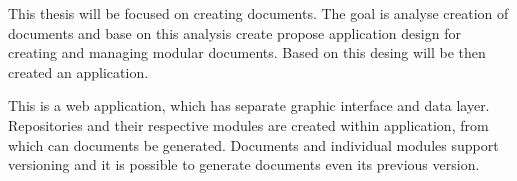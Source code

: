 This thesis will be focused on creating documents. The goal is analyse creation of documents and base on this analysis create
propose application design for creating and managing modular documents. Based on this desing will be then created an application.

This is a web application, which has separate graphic interface and data layer. Repositories and their respective modules are
created within application, from which can documents be generated. Documents and individual modules support versioning and
it is possible to generate documents even its previous version.